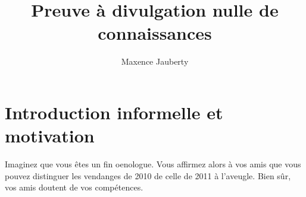 \documentclass[a4paper]{article}
\begin{document}
\title{Preuve à divulgation nulle de connaissances}
\author{Maxence Jauberty}
\maketitle
\section{Introduction informelle et motivation}
Imaginez que vous êtes un fin oenologue. Vous affirmez alors à vos amis que vous pouvez distinguer 
les vendanges de 2010 de celle de 2011 à l'aveugle. Bien sûr, vos amis doutent de vos compétences.
\end{document}
